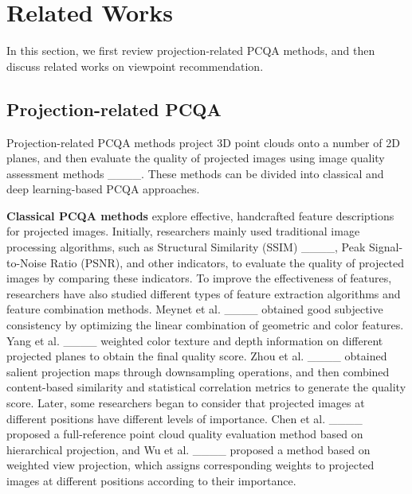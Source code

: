 \section{Related Works}
\label{sec:related_works}
In this section, we first review projection-related PCQA methods, and then discuss related works on viewpoint recommendation.

\subsection{Projection-related PCQA}
Projection-related PCQA methods project 3D point clouds onto a number of 2D planes, and then evaluate the quality of projected images using image quality assessment methods ____. 
These methods can be divided into classical and deep learning-based PCQA approaches.

\textbf{Classical PCQA methods} explore effective, handcrafted feature descriptions for projected images.
Initially, researchers mainly used traditional image processing algorithms, such as Structural Similarity (SSIM) ____, Peak Signal-to-Noise Ratio (PSNR), and other indicators, to evaluate the quality of projected images by comparing these indicators.
To improve the effectiveness of features, researchers have also studied different types of feature extraction algorithms and feature combination methods. 
Meynet et al. ____ obtained good subjective consistency by optimizing the linear combination of geometric and color features.
Yang et al. ____ weighted color texture and depth information on different projected planes to obtain the final quality score.
Zhou et al. ____ obtained salient projection maps through downsampling operations, and then combined content-based similarity and statistical correlation metrics to generate the quality score.
Later, some researchers began to consider that projected images at different positions have different levels of importance. 
Chen et al. ____ proposed a full-reference point cloud quality evaluation method based on hierarchical projection, and Wu et al. ____ proposed a method based on weighted view projection, which assigns corresponding weights to projected images at different positions according to their importance.

